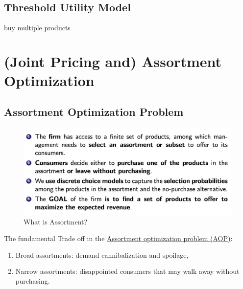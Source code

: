 \documentclass[11pt,a4paper]{article}
\begin{document}
\subsection{ Threshold Utility Model}
buy multiple products

\section{ (Joint Pricing and) Assortment Optimization}
\subsection{ Assortment Optimization Problem}
\begin{center}\begin{figure}[htbp]
    \centering
    \includegraphics[scale=0.4]{A1.png}
    \caption{What is Assortment?}
    \label{}
\end{figure}\end{center}
The fundamental Trade off in the \underline{Assortment optimization problem (AOP)}:
\begin{enumerate}[$\bullet$]
    \item Broad assortments: demand cannibalization and spoilage,
    \item Narrow assortments: disappointed consumers that may walk away without purchasing.
\end{enumerate}
\end{document}
